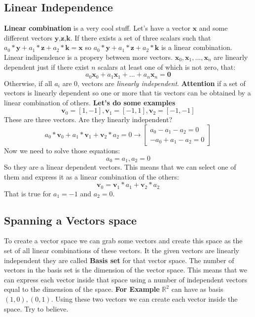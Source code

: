 \documentclass[12pt,a4paper,twoside,openright]{scrbook}
\begin{document}
\subsection{Linear Independence}
\textbf{Linear combination} is a very cool stuff. Let's have a vector $\textbf{x}$ and some different vectors $\textbf{y,z,k}$. If there exists a set of three scalars such that $a_0*\textbf{y} + a_1*\textbf{z} + a_2*\textbf{k} = \textbf{x}$ so $a_0*\textbf{y} + a_1*\textbf{z} + a_2*\textbf{k}$ is a linear combination.
Linear indipendence is a propery between more vectors. $\textbf{x}_0, \textbf{x}_1,...,  \textbf{x}_n$ are linearly dependent  just if there exist $n$ scalars at least one of which is not zero, that:
\[a_0\textbf{x}_0 + a_1\textbf{x}_1 +  ... + a_n\textbf{x}_n = \textbf{0} \]
Otherwise, if all $a_i$ are 0, vectors are \textit{linearly independent}.
\textbf{Attention} if a set of vectors is linearly dependent so one or more that tis vectors can be obtained by a linear combination of others.
\newline
\textbf{Let's do some examples}
\[\textbf{v}_0 = [1,-1], \textbf{v}_1=[-1,1] , \textbf{v}_2 = [-1,-1]\]
These are three vectors. Are they linearly independent?
\[a_0*\textbf{v}_0  +  a_1*\textbf{v}_1 + \textbf{v}_2*a_2  = 0 \rightarrow \begin{bmatrix}
 a_0 - a_1 - a_2 = 0 \\ -a_0 + a_1 - a_2 = 0
\end{bmatrix} \]
Now we need to solve those equations:
\[a_0 = a_1, a_2 = 0\]
So they are a linear dependent vectors. This means that we can select one of them and express it as a linear combination of the others:
\[\textbf{v}_0 = \textbf{v}_1*a_1 + \textbf{v}_2*a_2\]
That is true for $a_1 = -1$ and $a_2 = 0$.

\subsection{Spanning a Vectors space}
To create a vector space we can grab some vectors and create this space as the set of all linear combinations of these vectors. It the given vectors are linearly independent they are called \textbf{Basis set} for that vector space. The number of vectors in the basis set is the dimension of the vector space. This means that we can express each vector inside that space using a number of independent vectors equal to the dimension of the space.\newline
\textbf{For Example} $\mathbb{R}^2$ can have as basis $(1,0), (0,1)$. Using these two vectors we can create each vector inside the space. Try to believe.
\end{document}
